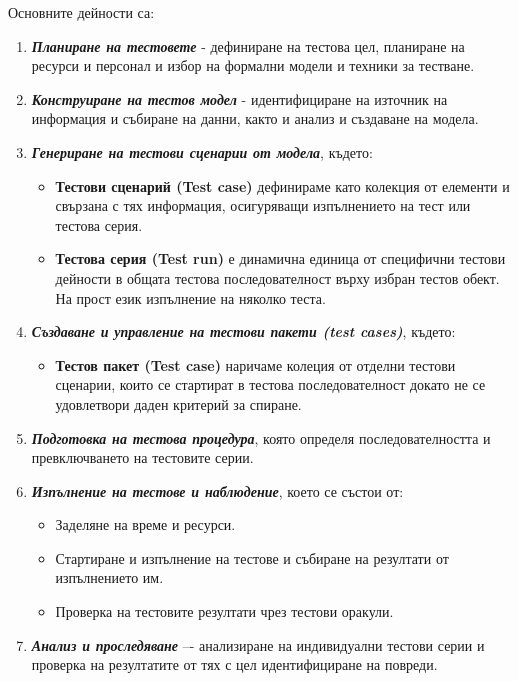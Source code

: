 \documentclass[fleqn,12pt]{article}
\begin{document}
Основните дейности са:
\begin{enumerate}
    \item \textbf{\textit{Планиране на тестовете}} - дефиниране на тестова цел, планиране на ресурси и персонал и избор на формални модели и техники за тестване.
    \item \textbf{\textit{Конструиране на тестов модел}} - идентифициране на източник на информация и събиране на данни, както и анализ и създаване на модела.
    \item \textbf{\textit{Генериране на тестови сценарии от модела}}, където:
    \begin{itemize}
        \item \textbf{Тестови сценарий (Test case)} дефинираме като колекция от елементи и свързана с тях информация, осигуряващи изпълнението на тест или тестова серия.
        \item \textbf{Тестова серия (Test run)} е динамична единица от специфични тестови дейности в общата тестова последователност върху избран тестов обект.
        На прост език изпълнение на няколко теста.
    \end{itemize}
    \item \textbf{\textit{Създаване и управление на тестови пакети (test cases)}}, където:
    \begin{itemize}
        \item \textbf{Тестов пакет (Test case)} наричаме колеция от отделни тестови сценарии, които се стартират в тестова последователност докато не се удовлетвори даден критерий за спиране.
    \end{itemize}
    \item \textbf{\textit{Подготовка на тестова процедура}}, която определя последователността и превключването на тестовите серии.
    \item \textbf{\textit{Изпълнение на тестове и наблюдение}}, което се състои от:
    \begin{itemize}
        \item Заделяне на време и ресурси.
        \item Стартиране и изпълнение на тестове и събиране на резултати от изпълнението им.
        \item Проверка на тестовите резултати чрез тестови оракули.
    \end{itemize}
    \item \textbf{\textit{Анализ и проследяване}} –- анализиране на индивидуални тестови серии и проверка на резултатите от тях с цел идентифициране на повреди.
\end{enumerate}
\end{document}

